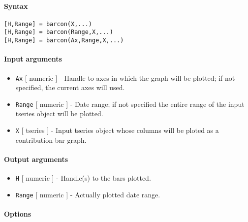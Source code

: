 


	\paragraph{Syntax}

\begin{verbatim}
[H,Range] = barcon(X,...)
[H,Range] = barcon(Range,X,...)
[H,Range] = barcon(Ax,Range,X,...)
\end{verbatim}

\paragraph{Input arguments}

\begin{itemize}
\item
  \texttt{Ax} {[} numeric {]} - Handle to axes in which the graph will
  be plotted; if not specified, the current axes will used.
\item
  \texttt{Range} {[} numeric {]} - Date range; if not specified the
  entire range of the input tseries object will be plotted.
\item
  \texttt{X} {[} tseries {]} - Input tseries object whose columns will
  be ploted as a contribution bar graph.
\end{itemize}

\paragraph{Output arguments}

\begin{itemize}
\item
  \texttt{H} {[} numeric {]} - Handle(s) to the bars plotted.
\item
  \texttt{Range} {[} numeric {]} - Actually plotted date range.
\end{itemize}

\paragraph{Options}

